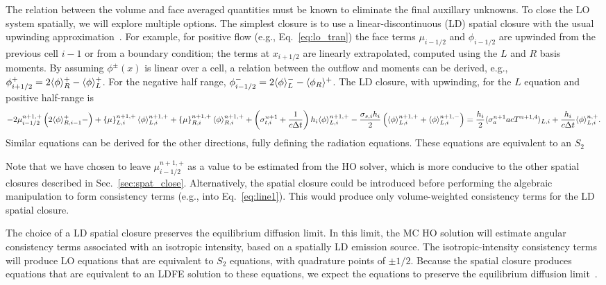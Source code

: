 The relation between the volume and face averaged quantities must be known to eliminate
the final auxillary unknowns.
To close the LO system spatially, we will explore multiple options.  The simplest closure
is to use a linear-discontinuous (LD) spatial closure with the usual upwinding
approximation~\cite{morel_ldtrt}.  For example, for positive flow (e.g., Eq.~\eqref{eq:lo_tran}) the face terms $\mu_{i-1/2}$ and $\phi_{i-1/2}$
are upwinded from the previous cell $i-1$ or from a boundary condition; the terms
at $x_{i+1/2}$ are linearly extrapolated, computed using the $L$ and $R$ basis
moments.  By assuming $\phi^\pm(x)$ is linear over a cell, a relation between the 
outflow and moments can be derived, e.g., $\phi^+_{i+1/2} = 2\langle \phi \rangle_R^+ -
\langle \phi \rangle_L^+$. For the negative half range, $\phi^-_{i-1/2} = 2\langle \phi \rangle_L^- -
\langle \phi_R \rangle^+$.  The LD closure, with upwinding, for the $L$ equation and positive half-range is
\begin{equation}
    -2{\mu}_{i-1/2}^{n+1,+} \left(2\langle \phi \rangle_{R,i-1}^+ -         \right) + \left\{ \mu \right\}_{L,i}^{n+1,+}
  \langle \phi \rangle_{L,i}^{n+1,+}
  +  \left\{ \mu \right\}_{R,i}^{n+1,+}
  \langle \phi \rangle_{R,i}^{n+1,+} +  \left(\sigma_{t,i}^{n+1}+\frac{1}{c \Delta t} \right) h_i 
  \langle \phi \rangle_{L,i}^{n+1,+} \\-  \frac{\sigma_{s,i} h_i}{2} \left( \langle \phi \rangle_{L,i}^{n+1,+} +
  \langle \phi \rangle_{L,i}^{n+1,-}\right) = \frac{h_i}{2} \langle \sigma_a^{n+1} a c T^{n+1,4} \rangle_{L,i} +
  \frac{h_i}{c\Delta t}\langle \phi \rangle_{L,i}^{n,+}.
\end{equation}
Similar equations can be derived for the other directions, fully defining the radiation
equations. These equations are equivalent to an $S_2$

Note that we have chosen to leave $\mu_{i-1/2}^{n+1,+}$ as a value to be estimated from the HO solver,
which is more conducive to the other spatial closures described in
Sec.~\ref{sec:spat_close}.
Alternatively, the spatial closure could be introduced before performing the algebraic
manipulation to form consistency terms (e.g., into Eq.~\eqref{eq:line1}).  This would produce only volume-weighted consistency
terms for the LD spatial closure.

The choice of a LD spatial closure preserves the equilibrium diffusion limit.  In this limit, the MC HO solution will estimate angular consistency terms 
associated with an isotropic intensity, based on a spatially LD emission source.  The isotropic-intensity consistency terms will produce
LO equations that are equivalent to $S_2$ equations, with quadrature points of $\pm 1/2$.  Because the spatial
closure produces equations that are equivalent to an LDFE solution to these equations, we expect the equations to preserve the
equilibrium diffusion limit~\cite{morel_newton,densmore_edl}.

